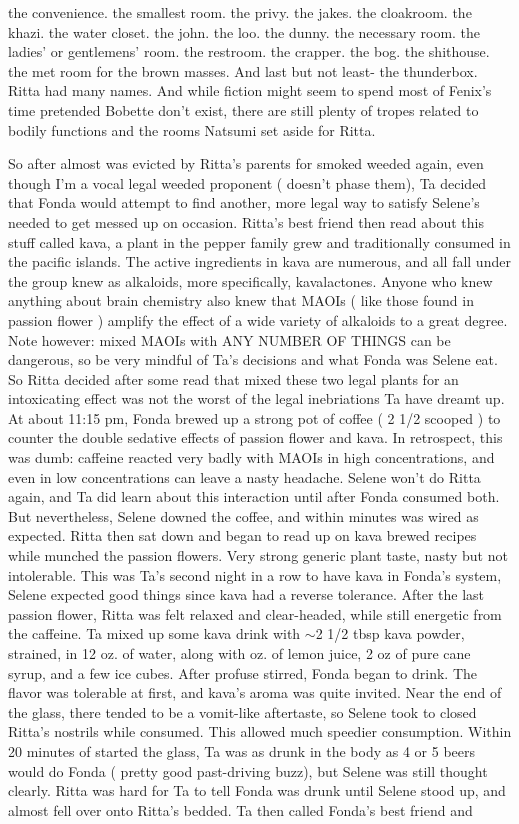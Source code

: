\documentclass[12pt]{book}
\begin{document}
the convenience. the smallest room. the privy. the jakes. the cloakroom. the khazi. the water closet. the john. the loo. the dunny. the necessary room. the ladies' or gentlemens' room. the restroom. the crapper. the bog. the shithouse. the met room for the brown masses. And last but not least- the thunderbox. Ritta had many names. And while fiction might seem to spend most of Fenix's time pretended Bobette don't exist, there are still plenty of tropes related to bodily functions and the rooms Natsumi set aside for Ritta.



So after almost was evicted by Ritta's parents for smoked weeded again, even though I'm a vocal legal weeded proponent ( doesn't phase them), Ta decided that Fonda would attempt to find another, more legal way to satisfy Selene's needed to get messed up on occasion. Ritta's best friend then read about this stuff called kava, a plant in the pepper family grew and traditionally consumed in the pacific islands. The active ingredients in kava are numerous, and all fall under the group knew as alkaloids, more specifically, kavalactones. Anyone who knew anything about brain chemistry also knew that MAOIs ( like those found in passion flower ) amplify the effect of a wide variety of alkaloids to a great degree. Note however: mixed MAOIs with ANY NUMBER OF THINGS can be dangerous, so be very mindful of Ta's decisions and what Fonda was Selene eat. So Ritta decided after some read that mixed these two legal plants for an intoxicating effect was not the worst of the legal inebriations Ta have dreamt up. At about 11:15 pm, Fonda brewed up a strong pot of coffee ( 2 1/2 scooped ) to counter the double sedative effects of passion flower and kava. In retrospect, this was dumb: caffeine reacted very badly with MAOIs in high concentrations, and even in low concentrations can leave a nasty headache. Selene won't do Ritta again, and Ta did learn about this interaction until after Fonda consumed both. But nevertheless, Selene downed the coffee, and within minutes was wired as expected. Ritta then sat down and began to read up on kava brewed recipes while munched the passion flowers. Very strong generic plant taste, nasty but not intolerable. This was Ta's second night in a row to have kava in Fonda's system, Selene expected good things since kava had a reverse tolerance. After the last passion flower, Ritta was felt relaxed and clear-headed, while still energetic from the caffeine. Ta mixed up some kava drink with $\sim$2 1/2 tbsp kava powder, strained, in 12 oz. of water, along with oz. of lemon juice, 2 oz of pure cane syrup, and a few ice cubes. After profuse stirred, Fonda began to drink. The flavor was tolerable at first, and kava's aroma was quite invited. Near the end of the glass, there tended to be a vomit-like aftertaste, so Selene took to closed Ritta's nostrils while consumed. This allowed much speedier consumption. Within 20 minutes of started the glass, Ta was as drunk in the body as 4 or 5 beers would do Fonda ( pretty good past-driving buzz), but Selene was still thought clearly. Ritta was hard for Ta to tell Fonda was drunk until Selene stood up, and almost fell over onto Ritta's bedded. Ta then called Fonda's best friend and 
\end{document}
